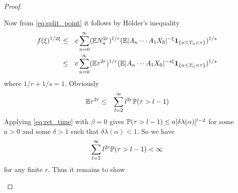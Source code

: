 \documentclass{article}
\theoremstyle{remark}
\begin{document}
\begin{proof}
\begin{enumerate}
    Now from \eqref{eq:split_point} it follows by H\"older's inequality
    \begin{eqnarray*}
      f(\xi)^{1/2\xi}
      &\leq&
      c \sum_{n=0}^\infty
      (\E N_u^{2r})^{1/r}
      (\E |A_n \cdots A_1 X_0|^{-\xi}\1{n \leq T_u < \tau})^{1/s} \\
      &\leq&
      c \sum_{n=0}^\infty
      (\E\tau^{2r})^{1/r}
      (\E |A_n \cdots A_1 X_0|^{-s\xi}\1{n \leq T_u < \tau})^{1/s}
    \end{eqnarray*}
    where $1/r + 1/s = 1$. Obviously
    \begin{eqnarray*}
      \E \tau^{2r}
      &\leq&
      \sum_{l=2}^\infty l^{2r} \P(\tau > l-1)
    \end{eqnarray*}
    Applying \eqref{eq:ret_time} with $\beta = 0$ gives $\P(\tau >
    l-1) \leq a [\delta \lambda(\alpha)]^{l-2}$ for some $a > 0$ and
    some $\delta > 1$ such that $\delta \lambda(\alpha) < 1$. So we
    have
    \begin{eqnarray*}
      \sum_{l=2}^\infty l^{2r} \P(\tau > l-1) < \infty
    \end{eqnarray*}
    for any finite $r$. Thus it remains to show


\end{enumerate}
\end{proof}
\end{document}

